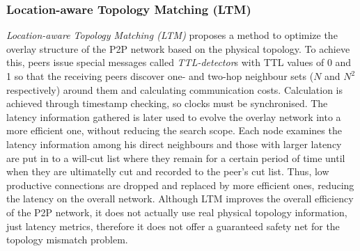 
\subsubsection{Location-aware Topology Matching (LTM)}
\emph{Location-aware Topology Matching (LTM)} \cite{liu_ltm_2004} proposes a
method to optimize the overlay structure of the P2P network based on the
physical topology. To achieve this, peers issue special messages called
\textit{TTL-detector}s with TTL values of 0 and 1 so that the receiving peers
discover one- and two-hop neighbour sets ($N$ and $N^2$ respectively) around
them and calculating communication costs. Calculation is achieved through
timestamp checking, so clocks must be synchronised. The latency information
gathered is later used to evolve the overlay network into a more efficient one,
without reducing the search scope. Each node examines the latency information
among his direct neighbours and those with larger latency are put in to a
will-cut list where they remain for a certain period of time until when they are
ultimatelly cut and recorded to the peer's cut list. Thus, low productive
connections are dropped and replaced by more efficient ones, reducing the
latency on the overall network. Although LTM improves the overall efficiency of
the P2P network, it does not actually use real physical topology information,
just latency metrics, therefore it does not offer a guaranteed safety net for
the topology mismatch problem.

